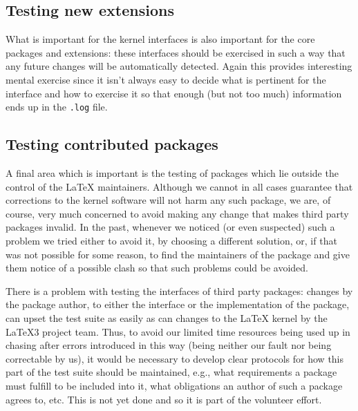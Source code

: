 \documentclass{ltugboat}
\begin{document}
\subsection{Testing new extensions}

What is important for the kernel interfaces is also important for the
core packages and extensions: these interfaces should be exercised in
such a way that any future changes will be automatically detected. Again
this provides interesting mental exercise since it isn't always easy
to decide what is pertinent for the interface and how to exercise it
so that enough (but not too much) information ends up in the
\texttt{.log} file.


\subsection{Testing contributed packages}

A final area which is important is the testing of packages which lie
outside the control of the \LaTeX{} maintainers. Although we cannot
in all cases guarantee that corrections to the kernel software
will not harm any such package, we are, of course, very much concerned
to avoid making any change that makes third party packages
invalid. In the past, whenever we noticed (or even suspected)
such a problem we tried either to avoid it, by choosing a different
solution, or, if that was not possible for some reason, to find the
maintainers of the package and give them notice of a possible
clash so that such problems could be avoided.

There is a problem with testing the interfaces of third party packages:
changes by the package author, to either the interface or the
implementation of the package, can upset the test suite as easily as
can changes to the \LaTeX{} kernel by the \LaTeX3 project team.  Thus,
to avoid our limited time resources being used up in chasing after
errors introduced in this way (being neither our fault nor being
correctable by us), it would be necessary to develop clear protocols for
how this part of the test suite should be maintained, e.g., what
requirements a package must fulfill to be included into it, what
obligations an author of such a package agrees to, etc. This is not
yet done and so it is part of the volunteer effort.

\smallskip
\end{document}
